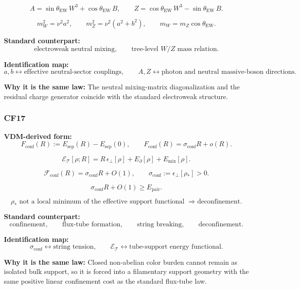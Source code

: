 \documentclass[11pt]{article}
\theoremstyle{definition}
\theoremstyle{plain}
\theoremstyle{remark}
\begin{document}
\[
A = \sin\theta_{\mathrm{EW}}\,W^3 + \cos\theta_{\mathrm{EW}}\,B,
\qquad
Z = \cos\theta_{\mathrm{EW}}\,W^3 - \sin\theta_{\mathrm{EW}}\,B.
\]

\[
m_W^2 = \nu^2 a^2,
\qquad
m_Z^2 = \nu^2(a^2+b^2),
\qquad
m_W = m_Z\cos\theta_{\mathrm{EW}}.
\]

\textbf{Standard counterpart:}
\[
\text{electroweak neutral mixing},
\qquad
\text{tree-level }W/Z\text{ mass relation}.
\]

\textbf{Identification map:}
\[
a,b \leftrightarrow \text{effective neutral-sector couplings},
\qquad
A,Z \leftrightarrow \text{photon and neutral massive-boson directions}.
\]

\textbf{Why it is the same law:} The neutral mixing-matrix diagonalization and
the residual charge generator coincide with the standard electroweak structure.


\subsubsection*{CF17}
\textbf{VDM-derived form:}
\[
F_{\mathrm{conf}}(R)
:=
E_{\mathrm{sep}}(R)-E_{\mathrm{sep}}(0),
\qquad
F_{\mathrm{conf}}(R)=\sigma_{\mathrm{conf}}R+o(R).
\]

\[
\mathcal E_{\mathcal T}[\rho;R]
=
R\,\epsilon_\perp[\rho]
+
E_\partial[\rho]
+
E_{\mathrm{mix}}[\rho].
\]

\[
\mathcal F_{\mathrm{conf}}(R)
=
\sigma_{\mathrm{conf}}R + O(1),
\qquad
\sigma_{\mathrm{conf}}:=\epsilon_\perp[\rho_\ast] > 0.
\]

\[
\sigma_{\mathrm{conf}}R + O(1) \ge E_{\mathrm{pair}}.
\]

\[
\rho_\ast \text{ not a local minimum of the effective support functional }
\Longrightarrow
\text{deconfinement}.
\]

\textbf{Standard counterpart:}
\[
\text{confinement},
\qquad
\text{flux-tube formation},
\qquad
\text{string breaking},
\qquad
\text{deconfinement}.
\]

\textbf{Identification map:}
\[
\sigma_{\mathrm{conf}} \leftrightarrow \text{string tension},
\qquad
\mathcal E_{\mathcal T} \leftrightarrow \text{tube-support energy functional}.
\]

\textbf{Why it is the same law:} Closed non-abelian color burden cannot remain
as isolated bulk support, so it is forced into a filamentary support geometry
with the same positive linear confinement cost as the standard flux-tube law.
\end{document}
